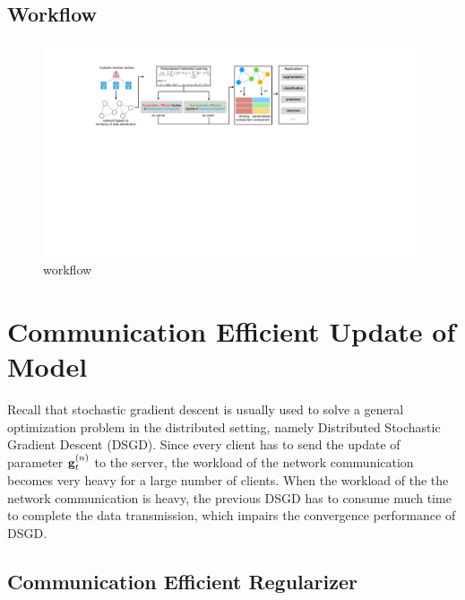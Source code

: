 \documentclass[journal]{IEEEtran}
\begin{document}
\subsection{Workflow}


\begin{figure}[!t]
\setlength{\abovecaptionskip}{0pt}
\setlength{\belowcaptionskip}{0pt}
\centering 
\includegraphics[width=1.98\columnwidth]{figs/figs_workflow}
\caption{workflow}
\label{figure_xxx}
\end{figure}




\section{Communication Efficient Update of Model}

Recall that stochastic gradient descent is usually used to solve a general optimization problem in the distributed setting, namely Distributed Stochastic Gradient Descent (DSGD). Since every client has to send the update of parameter ${\bf g}^{(n)}_t$ to the server, the workload of the network communication  becomes very heavy for a large number of clients. When the workload of the the network communication is heavy, the previous DSGD has to consume much time to complete the data transmission, which impairs the convergence performance of DSGD.  

\subsection{Communication Efficient Regularizer}
\end{document}
